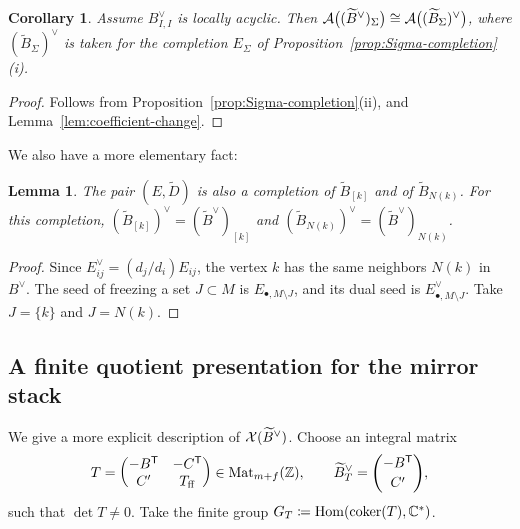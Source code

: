 \documentclass[12pt, letter]{amsart}
\newtheorem{lemma}[dummy]{Lemma}
\newtheorem{corollary}[dummy]{Corollary}
\theoremstyle{definition}
\begin{document}
\begin{corollary}\label{cor:dual-Sigma}
Assume $B^\vee_{I,I}$ is locally acyclic.
Then $\mathcal{A}\bigl((\widetilde B^\vee)_\Sigma\bigr)\cong\mathcal{A}\bigl((\widetilde B_\Sigma)^\vee\bigr)$, where $(\widetilde B_\Sigma)^\vee$ is taken for the completion $E_\Sigma$ of Proposition~\ref{prop:Sigma-completion}(i).
\end{corollary}
\begin{proof}
Follows from Proposition~\ref{prop:Sigma-completion}(ii), and Lemma~\ref{lem:coefficient-change}.
\end{proof}

We also have a more elementary fact:
\begin{lemma}\label{lem:dual-freezing}
The pair $(E,\widetilde D)$ is also a completion of $\widetilde B_{[k]}$ and of $\widetilde B_{N(k)}$.
For this completion, $(\widetilde B_{[k]})^\vee=(\widetilde B^\vee)_{[k]}$ and $(\widetilde B_{N(k)})^\vee=(\widetilde B^\vee)_{N(k)}$.
\end{lemma}
\begin{proof}
Since $E^\vee_{ij}=(d_j/d_i)E_{ij}$, the vertex $k$ has the same neighbors $N(k)$ in $B^\vee$.
The seed of freezing a set $J\subset M$ is $E_{\bullet,M\setminus J}$, and its dual seed is $E^\vee_{\bullet,M\setminus J}$.
Take $J=\{k\}$ and $J=N(k)$.
\end{proof}




\subsection{A finite quotient presentation for  the mirror stack}\label{sec:mirror-stack}

We give a more explicit description of \(\mathcal{X}(\widetilde B^\vee)\).
Choose an integral matrix
\begin{equation}\label{alg:completion}
 T=\begin{pmatrix}-B^{\mathsf T}&-C^{\mathsf T}\\
 C'&T_{\rm ff}\end{pmatrix} \in \operatorname{Mat}_{m+f}(\mathbb{Z}),
 \qquad
 \widetilde B_T^\vee=\binom{-B^{\mathsf T}}{C'},
\end{equation}
such that \(\det T \neq 0\).
Take the finite group \(G_T \coloneqq \operatorname{Hom}(\operatorname{coker}(T), \mathbb{C}^*)\).
\end{document}
